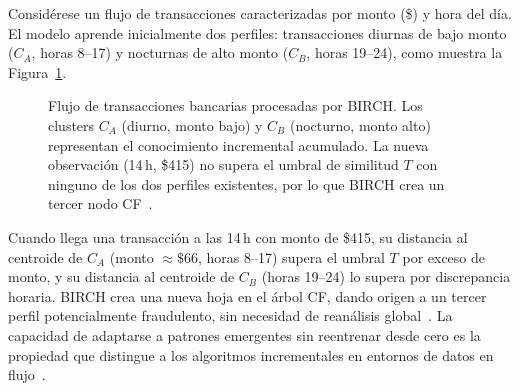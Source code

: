 Considérese un flujo de transacciones caracterizadas por monto (\$) y hora del día. El modelo aprende inicialmente dos perfiles: transacciones diurnas de bajo monto ($C_A$, horas 8–17) y nocturnas de alto monto ($C_B$, horas 19–24), como muestra la Figura~\ref{fig:incremental}.

\begin{figure}[H]
\centering
{}
\caption{Flujo de transacciones bancarias procesadas por BIRCH. Los clusters $C_A$ (diurno, monto bajo) y $C_B$ (nocturno, monto alto) representan el conocimiento incremental acumulado. La nueva observación (14\,h, \$415) no supera el umbral de similitud $T$ con ninguno de los dos perfiles existentes, por lo que BIRCH crea un tercer nodo CF~\cite{zhang1996birch}.}
\label{fig:incremental}
\end{figure}

Cuando llega una transacción a las 14\,h con monto de \$415, su distancia al centroide de $C_A$ (monto $\approx\$66$, horas 8–17) supera el umbral $T$ por exceso de monto, y su distancia al centroide de $C_B$ (horas 19–24) lo supera por discrepancia horaria. BIRCH crea una nueva hoja en el árbol CF, dando origen a un tercer perfil potencialmente fraudulento, sin necesidad de reanálisis global~\cite{zhang1996birch}. La capacidad de adaptarse a patrones emergentes sin reentrenar desde cero es la propiedad que distingue a los algoritmos incrementales en entornos de datos en flujo~\cite{gama2014survey}.